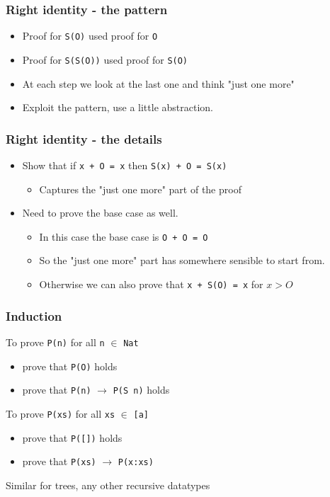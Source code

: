 \documentclass{beamer}
\begin{document}
\begin{frame}[fragile]
    \frametitle {Right identity - the pattern}

\begin{itemize}
\item Proof for \Verb?S(O)? used proof for \Verb?O?
\item Proof for \Verb?S(S(O))? used proof for \Verb?S(O)?
\item At each step we look at the last one and think "just one more"
\item Exploit the pattern, use a little abstraction.
\end{itemize}

\end{frame}

\begin{frame}[fragile]
    \frametitle {Right identity - the details}

\begin{itemize}
\item Show that if \Verb?x + O = x? then \Verb?S(x) + O = S(x)? 
    \begin{itemize}
        \item Captures the "just one more" part of the proof
    \end{itemize}
\item Need to prove the base case as well.
    \begin{itemize}
    \item In this case the base case is \Verb?O + O = O?
    \item So the "just one more" part has somewhere sensible to start from.
    \item Otherwise we can also prove that \Verb?x + S(O) = x? for $x > O$
    \end{itemize}
\end{itemize}

\end{frame}


\begin{frame}[fragile]
    \frametitle {Induction}

To prove \Verb?P(n)? for all \Verb?n? $\in$ \Verb?Nat?
\begin{itemize}
\item prove that \Verb?P(O)? holds
\item prove that \Verb?P(n)? $\rightarrow$ \Verb?P(S n)? holds
\end{itemize}

\vspace{10pt}

To prove \Verb?P(xs)? for all \Verb?xs? $\in$ \Verb?[a]?
\begin{itemize}
\item prove that \Verb?P([])? holds
\item prove that \Verb?P(xs)? $\rightarrow$ \Verb?P(x:xs)?
\end{itemize}

\vspace{10pt}

Similar for trees, any other recursive datatypes

\end{frame}
\end{document}
